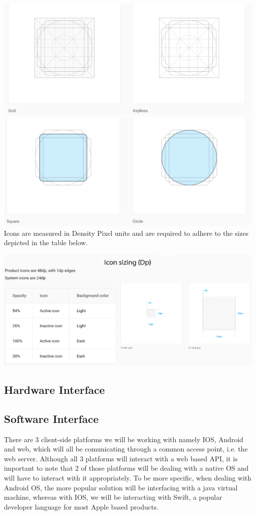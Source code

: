 \documentclass[11pt]{article}
\begin{document}
	\includegraphics[width=0.5\linewidth]{Images/gird.png}\\[1cm]
	\newline
	\includegraphics[width=0.5\linewidth]{Images/gird2.png}\\[1cm]
	
	Icons are measured in Density Pixel units and are required to adhere to the sizes depicted in the table below. \newline
	
		\includegraphics[width=0.5\linewidth]{Images/iconSizes.png}\\[1cm]

	\subsection{Hardware Interface}
	\subsection{Software Interface}
	There are 3 client-side platforms we will be working with namely IOS, Android and web, which will all be comunicating through a common access point, i.e. the web server.  Although all 3 platforms will interact with a web based API, it is important to note that 2 of those platforms will be dealing with a native OS and will have to interact with it appropriately.  To be more specific, when dealing with Android OS, the more popular solution will be interfacing with a java virtual machine, whereas with IOS, we will be interacting with Swift, a popular developer language for most Apple based products.  
	
\end{document}
